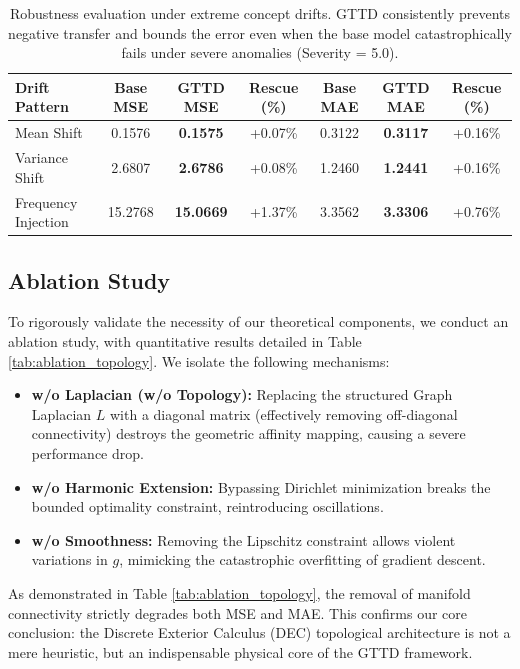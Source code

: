 \documentclass{article}
\begin{document}
\begin{table}[htbp]
\centering
\caption{Robustness evaluation under extreme concept drifts. GTTD consistently prevents negative transfer and bounds the error even when the base model catastrophically fails under severe anomalies (Severity = 5.0).}
\label{tab:extreme_drift}
\begin{tabular}{lcccccc}
\toprule
\textbf{Drift Pattern} & \textbf{Base MSE} & \textbf{GTTD MSE} & \textbf{Rescue (\%)} & \textbf{Base MAE} & \textbf{GTTD MAE} & \textbf{Rescue (\%)} \\
\midrule
Mean Shift & 0.1576 & \textbf{0.1575} & +0.07\% & 0.3122 & \textbf{0.3117} & +0.16\% \\
Variance Shift & 2.6807 & \textbf{2.6786} & +0.08\% & 1.2460 & \textbf{1.2441} & +0.16\% \\
Frequency Injection & 15.2768 & \textbf{15.0669} & +1.37\% & 3.3562 & \textbf{3.3306} & +0.76\% \\
\bottomrule
\end{tabular}
\end{table}



\subsection{Ablation Study}

To rigorously validate the necessity of our theoretical components, we conduct an ablation study, with quantitative results detailed in Table \ref{tab:ablation_topology}. We isolate the following mechanisms:
\begin{itemize}
    \item \textbf{w/o Laplacian (w/o Topology):} Replacing the structured Graph Laplacian $L$ with a diagonal matrix (effectively removing off-diagonal connectivity) destroys the geometric affinity mapping, causing a severe performance drop.
    \item \textbf{w/o Harmonic Extension:} Bypassing Dirichlet minimization breaks the bounded optimality constraint, reintroducing oscillations.
    \item \textbf{w/o Smoothness:} Removing the Lipschitz constraint allows violent variations in $g$, mimicking the catastrophic overfitting of gradient descent.
\end{itemize}

As demonstrated in Table \ref{tab:ablation_topology}, the removal of manifold connectivity strictly degrades both MSE and MAE. This confirms our core conclusion: the Discrete Exterior Calculus (DEC) topological architecture is not a mere heuristic, but an indispensable physical core of the GTTD framework.
\end{document}
